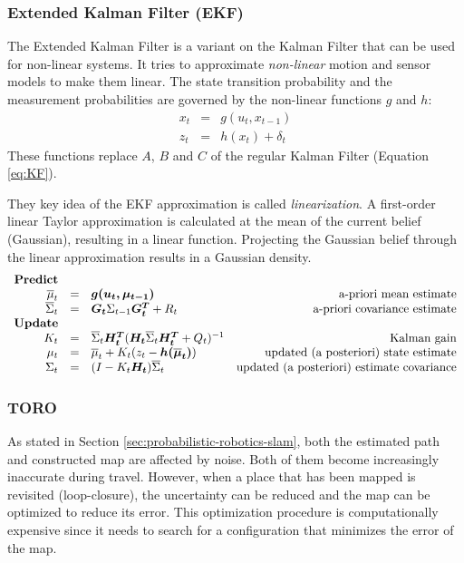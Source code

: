 \subsubsection{Extended Kalman Filter (EKF)}
The Extended Kalman Filter is a variant on the Kalman Filter that can be used for non-linear systems.
It tries to approximate \textit{non-linear} motion and sensor models to make them linear.
The state transition probability and the measurement probabilities are governed by the non-linear functions $g$ and $h$:
\begin{equation}
\begin{array}{rcl}
x_t & = & g(u_t, x_{t-1}) \\
z_t & = & h(x_t) + \delta_t
\end{array}
\end{equation}
These functions replace $A$, $B$ and $C$ of the regular Kalman Filter (Equation \ref{eq:KF}).

They key idea of the EKF approximation is called \textit{linearization}.
A first-order linear Taylor approximation is calculated at the mean of the current belief (Gaussian), resulting in a linear function.
Projecting the Gaussian belief through the linear approximation results in a Gaussian density.
\begin{equation}
\begin{array}{rclr}
\text{\textbf{Predict}} \\
\overline{\mu}_t & = & \boldsymbol{g(u_t, \mu_{t-1})} & \text{a-priori mean estimate} \\
\overline{\Sigma}_t & = & \boldsymbol{G_t} \Sigma_{t-1} \boldsymbol{G_t^T} + R_t  & \text{a-priori covariance estimate} \\
\text{\textbf{Update}} \\
K_t & = & \overline{\Sigma}_t \boldsymbol{H_t^T} (\boldsymbol{H_t} \overline{\Sigma}_t \boldsymbol{H_t^T} + Q_t)^{-1} & \text{Kalman gain} \\
\mu_t & = & \overline{\mu}_t + K_t(z_t - \boldsymbol{h(\overline{\mu}_t)}) & \text{updated (a posteriori) state estimate} \\
\Sigma_t & = & (I - K_t \boldsymbol{H_t}) \overline{\Sigma}_t & \text{updated (a posteriori) estimate covariance}
\end{array}
\end{equation}



\subsubsection{TORO}
\label{sec:prob-rob-toro}
As stated in Section \ref{sec:probabilistic-robotics-slam}, both the estimated path and constructed map are affected by noise.
Both of them become increasingly inaccurate during travel.
However, when a place that has been mapped is revisited (loop-closure), the uncertainty can be reduced and the map can be optimized to reduce its error.
This optimization procedure is computationally expensive since it needs to search for a configuration that minimizes the error of the map.

